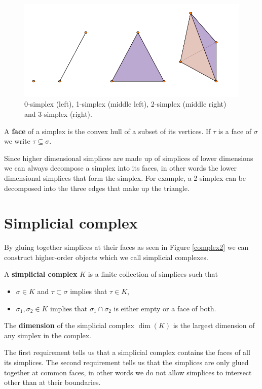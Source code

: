 \begin{figure}
  \centering
  \includegraphics[]{simplex.pdf}
  \caption{
  \label{simplices}
0-simplex (left), 1-simplex (middle left), 2-simplex (middle right) and 3-simplex (right).}
  \end{figure}
\begin{definition}
A \textbf{face} of a simplex is the convex hull of a subset of its vertices. If $\tau$ is a face of $\sigma$ we write $\tau \subseteq \sigma$.
\end{definition}
Since higher dimensional simplices are made up of simplices of lower dimensions we can always decompose a simplex into its faces, in other words the lower dimensional simplices that form the simplex. For example, a 2-simplex can be decomposed into the three edges that make up the triangle.
\section{Simplicial complex}
By gluing together simplices at their faces as seen in Figure \ref{complex2} we can construct higher-order objects which we call simplicial complexes.
\begin{definition} \label{defsimcomp}
A \textbf{simplicial complex} $K$ is a finite collection of simplices such that

\begin{itemize}
    \item $\sigma \in K$ and $\tau \subset \sigma$ implies that $\tau \in K$,
    \item $\sigma_{1}, \sigma_{2} \in K$ implies that $\sigma_{1} \cap \sigma_{2}$ is either empty or a face of both.
\end{itemize}
The \textbf{dimension} of the simplicial complex $\dim(K)$ is the largest dimension of any simplex in the complex.
\end{definition}
The first requirement tells us that a simplicial complex contains the faces of all its simplices. The second requirement tells us that the simplices are only glued together at common faces, in other words we do not allow simplices to intersect other than at their boundaries.


